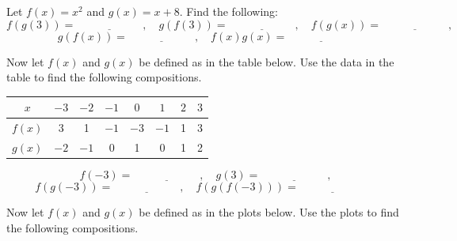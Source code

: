 \begin{activity}\label{A:0.3.2}
    \ba
        \item Let $f(x) = x^2$ and $g(x) = x+8$.  Find the following:
            \[ f(g(3)) = \underline{\hspace{1in}}, \quad g(f(3)) =
                \underline{\hspace{1in}}, \quad f(g(x)) = \underline{\hspace{1in}},\]
            \[ g(f(x)) = \underline{\hspace{1in}}, \quad f(x)g(x) = \underline{\hspace{1in}}
                \]
        \item Now let $f(x)$ and $g(x)$ be defined as in the table below.  Use the data in
            the table to find the following compositions.
            \begin{center}
                \begin{tabular}{|c||c|c|c|c|c|c|c|}
                    \hline
                    $x$ & $-3$ & $-2$ & $-1$ & $0$ & $1$ & $2$ & $3$ \\ \hline \hline
                    $f(x)$ & 3 & 1 & $-1$ & $-3$ & $-1$ & 1 & 3 \\ \hline
                    $g(x)$ & $-2$ & $-1$ & 0 & 1 & 0 & 1 & 2 \\ \hline
                \end{tabular}
            \end{center}
            \[ 
                f(-3) = \underline{\hspace{1in}}, \quad
                g(3) = \underline{\hspace{1in}}, \]
            \[  f(g(-3)) = \underline{\hspace{1in}}, \quad
                f(g(f(-3))) = \underline{\hspace{1in}} \quad
                \]
        \item Now let $f(x)$ and $g(x)$ be defined as in the plots below.  Use the plots
            to find the following compositions.


\end{activity}
